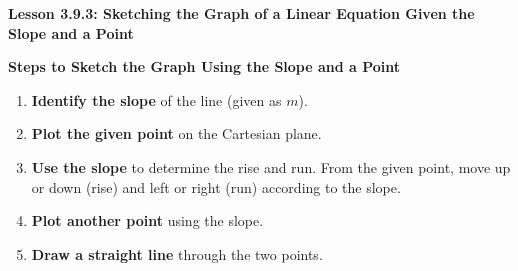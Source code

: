  \begin{center}
\textbf{Lesson 3.9.3: Sketching the Graph of a Linear Equation Given the Slope and a Point}
\end{center}

\vspace*{1ex}

\noindent\textbf{Steps to Sketch the Graph Using the Slope and a Point}

\begin{enumerate}
    \item \textbf{Identify the slope} of the line (given as $m$).
    \item \textbf{Plot the given point} on the Cartesian plane.
    \item \textbf{Use the slope} to determine the rise and run. From the given point, move up or down (rise) and left or right (run) according to the slope.
    \item \textbf{Plot another point} using the slope.
    \item \textbf{Draw a straight line} through the two points.
\end{enumerate}




